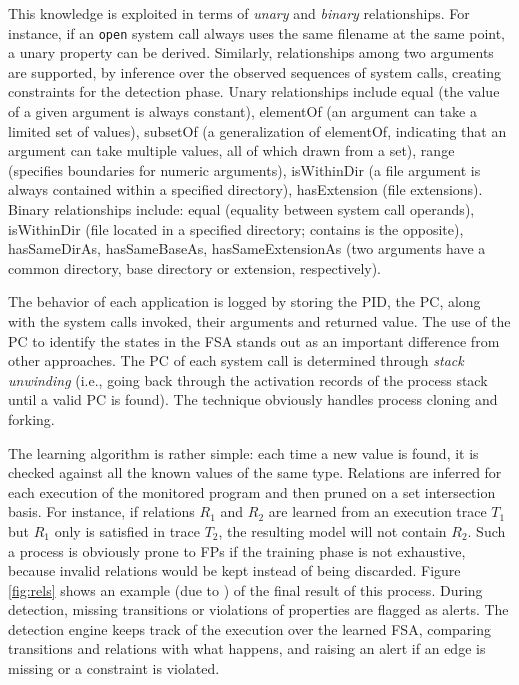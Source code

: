 This knowledge is exploited in terms of \emph{unary} and \emph{binary}
relationships. For instance, if an \texttt{open} system call always
uses the same filename at the same point, a unary property can be
derived. Similarly, relationships among two arguments are supported,
by inference over the observed sequences of system calls, creating
constraints for the detection phase. Unary relationships include
\textsf{equal} (the value of a given argument is always constant),
\textsf{elementOf} (an argument can take a limited set of values),
\textsf{subsetOf} (a generalization of \textsf{elementOf}, indicating
that an argument can take multiple values, all of which drawn from a
set), \textsf{range} (specifies boundaries for numeric arguments),
\textsf{isWithinDir} (a file argument is always contained within a
specified directory), \textsf{hasExtension} (file extensions). Binary
relationships include: \textsf{equal} (equality between system call
operands), \textsf{isWithinDir} (file located in a specified
directory; \textsf{contains} is the opposite), \textsf{hasSameDirAs},
\textsf{hasSameBaseAs}, \textsf{hasSameExtensionAs} (two arguments
have a common directory, base directory or extension, respectively).

The behavior of each application is logged by storing the \ac{PID},
the \ac{PC}, along with the system calls invoked, their arguments and
returned value. The use of the \ac{PC} to identify the
states in the \ac{FSA} stands out as an important
difference from other approaches. The \ac{PC} of each system call is
determined through \emph{stack unwinding} (i.e., going back through
the activation records of the process stack until a valid \ac{PC} is
found). The technique obviously handles process cloning and forking.

The learning algorithm is rather simple: each time a new value is
found, it is checked against all the known values of the same
type. Relations are inferred for each execution of the monitored
program and then pruned on a set intersection basis. For instance, if
relations $R_{1}$ and $R_{2}$ are learned from an execution trace
$T_{1}$ but $R_{1}$ only is satisfied in trace $T_{2}$, the resulting
model will not contain $R_{2}$. Such a process is obviously prone to
\acp{FP} if the training phase is not exhaustive, because
invalid relations would be kept instead of being discarded. Figure
\ref{fig:rels} shows an example (due to \citep{venkat_dataflow}) of
the final result of this process. During detection, missing
transitions or violations of properties are flagged as alerts. The
detection engine keeps track of the execution over the learned
\ac{FSA}, comparing transitions and relations with what
happens, and raising an alert if an edge is missing or a constraint is
violated.

